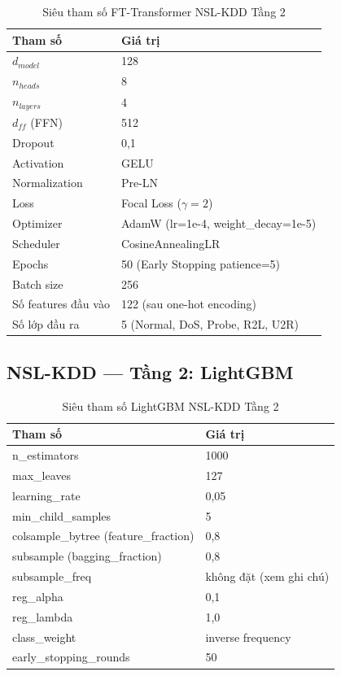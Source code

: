 \documentclass[../DoAn.tex]{subfiles}
\begin{document}
\begin{table}[H]
    \centering
    \caption{Siêu tham số FT-Transformer NSL-KDD Tầng 2}
    \label{tab:hyp-ftt-nsl}
    \begin{tabular}{ll}
        \hline
        \textbf{Tham số} & \textbf{Giá trị} \\
        \hline
        $d_{model}$ & 128 \\
        $n_{heads}$ & 8 \\
        $n_{layers}$ & 4 \\
        $d_{ff}$ (FFN) & 512 \\
        Dropout & 0,1 \\
        Activation & GELU \\
        Normalization & Pre-LN \\
        Loss & Focal Loss ($\gamma=2$) \\
        Optimizer & AdamW (lr=1e-4, weight\_decay=1e-5) \\
        Scheduler & CosineAnnealingLR \\
        Epochs & 50 (Early Stopping patience=5) \\
        Batch size & 256 \\
        Số features đầu vào & 122 (sau one-hot encoding) \\
        Số lớp đầu ra & 5 (Normal, DoS, Probe, R2L, U2R) \\
        \hline
    \end{tabular}
\end{table}

\subsection{NSL-KDD --- Tầng 2: LightGBM}

\begin{table}[H]
    \centering
    \caption{Siêu tham số LightGBM NSL-KDD Tầng 2}
    \label{tab:hyp-lgbm}
    \begin{tabular}{ll}
        \hline
        \textbf{Tham số} & \textbf{Giá trị} \\
        \hline
        n\_estimators & 1000 \\
        max\_leaves & 127 \\
        learning\_rate & 0,05 \\
        min\_child\_samples & 5 \\
        colsample\_bytree (feature\_fraction) & 0,8 \\
        subsample (bagging\_fraction) & 0,8 \\
        subsample\_freq & không đặt (xem ghi chú) \\
        reg\_alpha & 0,1 \\
        reg\_lambda & 1,0 \\
        class\_weight & inverse frequency \\
        early\_stopping\_rounds & 50 \\
        \hline
    \end{tabular}
\end{table}
\end{document}
